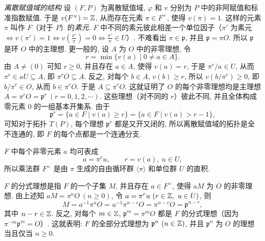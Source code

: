 \emph{离散赋值域的结构} 设 $(F,P)$ 为离散赋值域, $\varphi$ 和 $v$ 分别为 $P$ 中的非阿赋值和标准指数赋值. 于是 $v(F^{\times})=\mathbb{Z}$, 从而存在元素 $\pi\in F^{\times}$, 使得 $v(\pi)=1$. 这样的元素 $\pi$ 叫作 $F$（对于 $P$）的\emph{素元}. $F$ 中不同的素元彼此相差一个单位因子（$\pi'$ 为素元 $\Leftrightarrow v(\pi')=1\Leftrightarrow v\left(\frac{\pi'}{\pi}\right)=0\Leftrightarrow\frac{\pi'}{\pi}\in U$）. 不难看出 $\pi\in\mathfrak{p}$, 并且 $\mathfrak{p}=\pi O$. 所以 $\mathfrak{p}$ 是环 $O$ 中的主理想. 更一般的, 设 $A$ 为 $O$ 中的非零理想, 令
\[
  r=\min\{v(a)\mid 0\neq a\in A\}.
\]
由 $A\neq(0)$ 可知 $r\geqslant 0$, 并且存在 $a\in A$, 使得 $v(a)=r$, 于是 $\pi^r/a\in U$, 从而 $\pi^r\in aU\subseteq A$, 即 $\pi^rO\subseteq A$. 反之, 对每个 $b\in A$, $v(b)\geqslant r$, 所以 $v(b/\pi^r)\geqslant 0$, 即 $b/\pi^r\in O$, 从而 $b\in\pi^rO$. 于是 $A\subseteq\pi^rO$. 这就证明了 $O$ 的每个非零理想均是主理想 $A=\pi^rO=\mathfrak{p}^r\ (r=0,1,2,\cdots)$. 这些理想（对不同的 $r$）彼此不同, 并且全体构成零元素 $0$ 的一组基本开集系. 由于
\[
  \mathfrak{p}^r=\{a\in F\mid v(a)\geqslant r\}=\{a\in F\mid v(a)>r-1\},
\]
可知对于拓扑 $T(P)$, 每个理想 $\mathfrak{p}^r$ 都是又开又闭的, 所以离散赋值域的拓扑是全不连通的, 即 $F$ 的每个点都是一个连通分支.

$F$ 中每个非零元素 $a$ 均可表成
\[
  a=\pi^ru,\qquad r=v(a),\ u\in U,
\]
所以乘法群 $F^{\times}$ 是由 $\pi$ 生成的自由循环群 $\langle\pi\rangle$ 和单位群 $U$ 的直积.

$F$ 的分式理想是指 $F$ 的一个子集 $M$, 并且存在 $a\in F^{\times}$, 使得 $aM$ 为 $O$ 的非零理想. 由上述知 $aM=\pi^nO\ (n\geqslant 0)$, 令 $a=\pi^ru\ (r\in\mathbb{Z},\ u\in U)$, 则
\[
  M=a^{-1}\pi^nO=u^{-1}\pi^{n-r}O=\pi^{n-r}O=\mathfrak{p}^{n-r},
\]
其中 $n-r\in\mathbb{Z}$. 反之, 对每个 $m\in\mathbb{Z}$, $\mathfrak{p}^m=\pi^mO$ 都是 $F$ 的分式理想（因为 $\pi^{-m}\mathfrak{p}^m=O$）. 这就表明: $F$ 的全部分式理想为 $\mathfrak{p}^n\ (n\in\Z)$, 并且 $\mathfrak{p}^n$ 为 $O$ 的理想当且仅当 $n\geqslant 0$.

